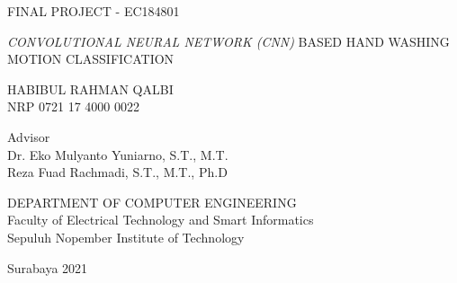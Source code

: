FINAL PROJECT - EC184801

\vspace{6ex}

\begin{large}
  \emph{CONVOLUTIONAL NEURAL NETWORK (CNN)} BASED HAND WASHING MOTION CLASSIFICATION
\end{large}

\vspace{4ex}

HABIBUL RAHMAN QALBI \\
NRP 0721 17 4000 0022

\vspace{2ex}

Advisor \\
Dr. Eko Mulyanto Yuniarno, S.T., M.T. \\
Reza Fuad Rachmadi, S.T., M.T., Ph.D


\vspace{6ex}

DEPARTMENT OF COMPUTER ENGINEERING \\
Faculty of Electrical Technology and Smart Informatics \\
Sepuluh Nopember Institute of Technology

Surabaya 2021
